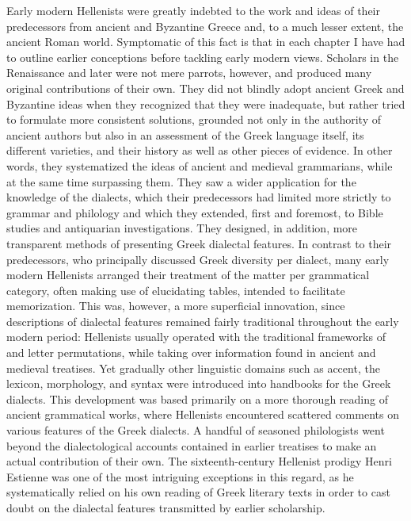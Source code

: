Early modern Hellenists were greatly indebted to the work and ideas of their predecessors from ancient and Byzantine Greece and, to a much lesser extent, the ancient Roman world. Symptomatic of this fact is that in each chapter I have had to outline earlier conceptions before tackling early modern views. Scholars in the Renaissance and later were not mere parrots, however, and produced many original contributions of their own. They did not blindly adopt ancient Greek and Byzantine ideas when they recognized that they were inadequate, but rather tried to formulate more consistent solutions, grounded not only in the authority of ancient authors but also in an assessment of the Greek language itself, its different varieties, and their history as well as other pieces of evidence. In other words, they systematized the ideas of ancient and medieval grammarians, while at the same time surpassing them. They saw a wider application for the knowledge of the dialects, which their predecessors had limited more strictly to grammar and philology and which they extended, first and foremost, to Bible studies and antiquarian investigations. They designed, in addition, more transparent methods of presenting Greek dialectal features. In contrast to their predecessors, who principally discussed Greek diversity per dialect, many early modern Hellenists arranged their treatment of the matter per grammatical category, often making use of elucidating tables, intended to facilitate memorization. This was, however, a more superficial innovation, since descriptions of dialectal features remained fairly traditional throughout the early modern period: Hellenists usually operated with the traditional frameworks of  and letter permutations, while taking over information found in ancient and medieval treatises. Yet gradually other linguistic domains such as accent, the lexicon, morphology, and syntax were introduced into handbooks for the Greek dialects. This development was based primarily on a more thorough reading of ancient grammatical works, where Hellenists encountered scattered comments on various features of the Greek dialects. A handful of seasoned philologists went beyond the dialectological accounts contained in earlier treatises to make an actual contribution of their own. The sixteenth-century Hellenist prodigy Henri Estienne was one of the most intriguing exceptions in this regard, as he systematically relied on his own reading of Greek literary texts in order to cast doubt on the dialectal features transmitted by earlier scholarship.

